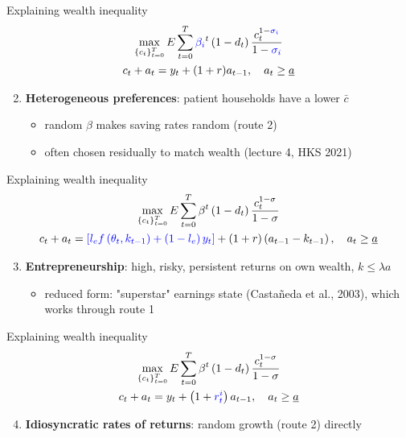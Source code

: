 \documentclass[10pt,english,10pt,handout]{beamer}
\begin{document}
\begin{frame}{Explaining wealth inequality}
\[
\begin{gathered}\max_{\left\{ c_{t}\right\} _{t=0}^{T}}E\sum_{t=0}^{T}\textcolor{blue}{\beta_{i}}^{t}\left(1-d_{t}\right)\frac{c_{t}^{1-\textcolor{blue}{\sigma_{i}}}}{1-\textcolor{blue}{\sigma_{i}}}\\
c_{t}+a_{t}=y_{t}+(1+r)a_{t-1},\quad a_{t}\geq\underline{a}
\end{gathered}
\]
\begin{enumerate}
\setcounter{enumi}{1}
\item \textbf{Heterogeneous preferences}: patient households have a lower $\bar{c}$
\begin{itemize}
\item random $\beta$ makes saving rates random (route 2)
\item often chosen residually to match wealth (lecture 4, HKS 2021)
\end{itemize}
\end{enumerate}
\end{frame}

\begin{frame}{Explaining wealth inequality}
\[
\begin{gathered}\max_{\left\{ c_{t}\right\} _{t=0}^{T}}E\sum_{t=0}^{T}\beta^{t}\left(1-d_{t}\right)\frac{c_{t}^{1-\sigma}}{1-\sigma}\\
c_{t}+a_{t}=\textcolor{blue}{\left[l_{e}f\left(\theta_{t},k_{t-1}\right)+\left(1-l_{e}\right)y_{t}\right]}+(1+r)\left(a_{t-1}-k_{t-1}\right),\quad a_{t}\geq\underline{a}
\end{gathered}
\]
\begin{enumerate}
\setcounter{enumi}{2}
\item \textbf{Entrepreneurship}: high, risky, persistent returns on own wealth, $k\leq\lambda a$
\begin{itemize}
\item reduced form: "superstar" earnings state (Castañeda et al., 2003), which works through route 1
\end{itemize}
\end{enumerate}
\end{frame}

\begin{frame}{Explaining wealth inequality}
\[
\begin{gathered}\max_{\left\{ c_{t}\right\} _{t=0}^{T}}E\sum_{t=0}^{T}\beta^{t}\left(1-d_{t}\right)\frac{c_{t}^{1-\sigma}}{1-\sigma}\\
c_{t}+a_{t}=y_{t}+\left(1+\textcolor{blue}{r_{t}^{i}}\right)a_{t-1},\quad a_{t}\geq\underline{a}
\end{gathered}
\]
\begin{enumerate}
\setcounter{enumi}{3}
\item \textbf{Idiosyncratic rates of returns}: random growth (route 2) directly
\end{enumerate}
\end{frame}
\end{document}
